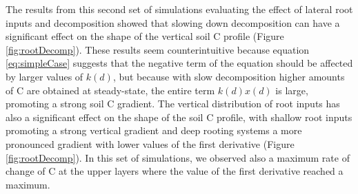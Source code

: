 \documentclass[11pt, oneside, a4paper]{article}   	%
\begin{document}
The results from this second set of simulations evaluating the effect of lateral root inputs and decomposition showed that slowing down decomposition can have a significant effect on the shape of the vertical soil C profile (Figure \ref{fig:rootDecomp}). These results seem counterintuitive because equation \ref{eq:simpleCase} suggests that the negative term of the equation should be affected by larger values of $k(d)$, but because with slow decomposition higher amounts of C are obtained at steady-state, the entire term $k(d) x(d)$ is large, promoting a strong soil C gradient. The vertical distribution of root inputs has also a significant effect on the shape of the soil C profile, with shallow root inputs promoting a strong vertical gradient and deep rooting systems a more pronounced gradient with lower values of the first derivative (Figure \ref{fig:rootDecomp}). In this set of simulations, we observed also a maximum rate of change of C at the upper layers where the value of the first derivative reached a maximum. 
\end{document}
